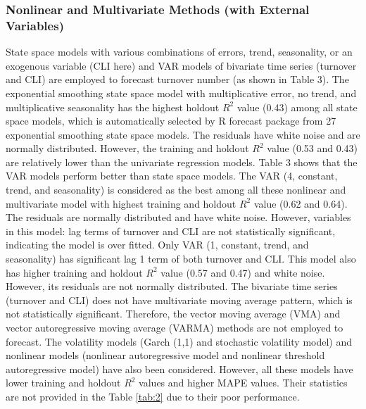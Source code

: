 \subsubsection{Nonlinear and Multivariate Methods (with External Variables)}
State space models with various combinations of errors, trend, seasonality, or an exogenous variable (CLI here) and VAR models of bivariate time series (turnover and CLI) are employed to forecast turnover number (as shown in Table 3). The exponential smoothing state space model with multiplicative error, no trend, and multiplicative seasonality has the highest holdout $R^2$ value (0.43) among all state space models, which is automatically selected by R forecast package from 27 exponential smoothing state space models. The residuals have white noise and are normally distributed. However, the training and holdout $R^2$ value (0.53 and 0.43) are relatively lower than the univariate regression models. 
Table 3 shows that the VAR models perform better than state space models. The VAR (4, constant, trend, and seasonality) is considered as the best among all these nonlinear and multivariate model with highest training and holdout $R^2$ value (0.62 and 0.64). The residuals are normally distributed and have white noise. However, variables in this model: lag terms of turnover and CLI are not statistically significant, indicating the model is over fitted. Only VAR (1, constant, trend, and seasonality) has significant lag 1 term of both turnover and CLI. This model also has higher training and holdout $R^2$ value (0.57 and 0.47) and white noise. However, its residuals are not normally distributed. 
The bivariate time series (turnover and CLI) does not have multivariate moving average pattern, which is not statistically significant. Therefore, the vector moving average (VMA) and vector autoregressive moving average (VARMA) methods are not employed to forecast. The volatility models (Garch (1,1) and stochastic volatility model) and nonlinear models (nonlinear autoregressive model and nonlinear threshold autoregressive model) have also been considered. However, all these models have lower training and holdout $R^2$ values and higher MAPE values. Their statistics are not provided in the Table \ref{tab:2} due to their poor performance.
